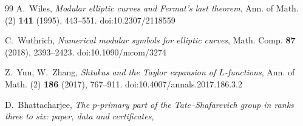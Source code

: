\documentclass[11pt]{amsart}
\theoremstyle{definition}
\begin{document}
\begin{thebibliography}{99}
 A.~Wiles, \emph{Modular elliptic curves and Fermat's last theorem}, Ann. of Math. (2) \textbf{141} (1995), 443--551. doi:10.2307/2118559

 C.~Wuthrich, \emph{Numerical modular symbols for elliptic curves}, Math. Comp. \textbf{87} (2018), 2393--2423. doi:10.1090/mcom/3274

 Z.~Yun, W.~Zhang, \emph{Shtukas and the Taylor expansion of $L$-functions}, Ann. of Math. (2) \textbf{186} (2017), 767--911. doi:10.4007/annals.2017.186.3.2

 D.~Bhattacharjee, \emph{The $p$-primary part of the Tate--Shafarevich group in ranks three to six: paper, data and certificates}, \ArchiveRef

\end{thebibliography}
\endgroup
\end{document}
